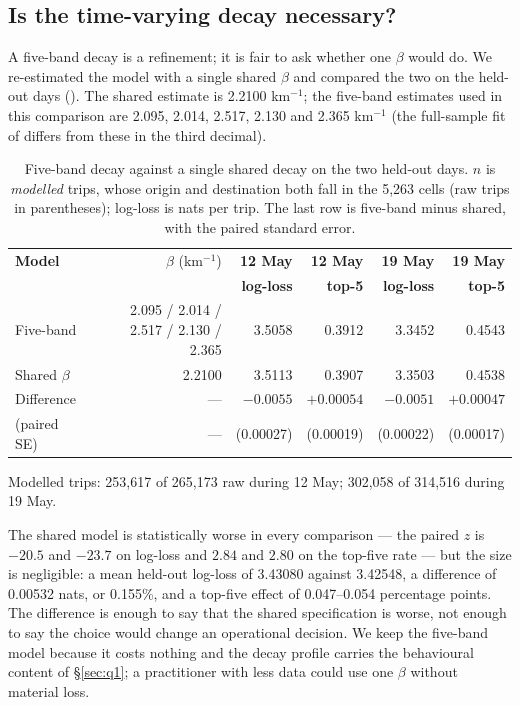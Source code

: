 \subsection{Is the time-varying decay necessary?}

A five-band decay is a refinement; it is fair to ask whether one $\beta$ would do.
We re-estimated the model with a single shared $\beta$ and compared the two on the
held-out days (). The shared estimate is
2.2100 km$^{-1}$; the five-band estimates used in this comparison are 2.095, 2.014,
2.517, 2.130 and 2.365 km$^{-1}$ (the full-sample fit of  differs from
these in the third decimal).

\begin{table}[htbp]
\centering
\footnotesize
\caption[Shared versus five-band decay]{Five-band decay against a single shared decay on
the two held-out days. $n$ is \emph{modelled} trips, whose origin and destination both
fall in the 5,263 cells (raw trips in parentheses); log-loss is nats per trip. The last
row is five-band minus shared, with the paired standard error.}
\label{tab:q1shared}
\scriptsize
\begin{tabular}{@{}lrrrrr@{}}
\toprule
\textbf{Model} & $\beta$ (km$^{-1}$) & \textbf{12 May} & \textbf{12 May} &
\textbf{19 May} & \textbf{19 May} \\
 & & \textbf{log-loss} & \textbf{top-5} & \textbf{log-loss} & \textbf{top-5} \\
\midrule
Five-band & 2.095 / 2.014 / 2.517 / 2.130 / 2.365 & 3.5058 & 0.3912 & 3.3452 & 0.4543 \\
Shared $\beta$ & 2.2100 & 3.5113 & 0.3907 & 3.3503 & 0.4538 \\
\midrule
Difference & --- & $-0.0055$ & $+0.00054$ & $-0.0051$ & $+0.00047$ \\
(paired SE) & --- & (0.00027) & (0.00019) & (0.00022) & (0.00017) \\
\bottomrule
\end{tabular}

\smallskip
\raggedright Modelled trips: 253,617 of 265,173 raw during 12 May; 302,058 of 314,516
during 19 May.
\end{table}

The shared model is statistically worse in every comparison --- the paired $z$ is
$-20.5$ and $-23.7$ on log-loss and $2.84$ and $2.80$ on the top-five rate --- but the
size is negligible: a mean held-out log-loss of 3.43080 against 3.42548, a difference of
0.00532 nats, or 0.155\%, and a top-five effect of 0.047--0.054 percentage points. The
difference is enough to say that the shared specification is worse, not enough
to say the choice would change an operational decision. We keep the
five-band model because it costs nothing and the decay profile carries the
behavioural content of \S\ref{sec:q1}; a practitioner with less data could use one
$\beta$ without material loss.

